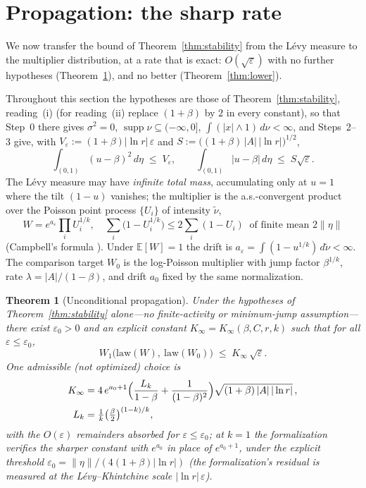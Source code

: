 \documentclass[pdflatex,sn-mathphys-num]{sn-jnl}
\theoremstyle{thmstyleone}
\newtheorem{theorem}{Theorem}
\theoremstyle{thmstyletwo}
\theoremstyle{thmstylethree}
\DeclareMathOperator{\supp}{supp}
\begin{document}
\section{Propagation: the sharp rate}
\label{sec:propagation}

We now transfer the bound of Theorem~\ref{thm:stability} from the
L\'evy measure to the multiplier distribution, at a rate that is
exact: $O(\sqrt\varepsilon)$ with no further hypotheses
(Theorem~\ref{thm:propagation}), and no better
(Theorem~\ref{thm:lower}).

Throughout this section the hypotheses are those of
Theorem~\ref{thm:stability}, reading~(i) (for reading~(ii) replace
$(1+\beta)$ by $2$ in every constant), so that Step~0 there gives
$\sigma^2 = 0$, $\supp\nu \subseteq (-\infty,0]$,
$\int(|x|\wedge1)\,d\nu < \infty$, and Steps~2--3 give, with
$V_\varepsilon := (1+\beta)|\ln r|\,\varepsilon$ and
$S := \bigl((1+\beta)\,|A|\,|\ln r|\bigr)^{1/2}$,
\begin{equation}\label{eq:VF}
  \int_{(0,1)}(u-\beta)^2\,d\eta \;\le\; V_\varepsilon,
  \qquad
  \int_{(0,1)}|u-\beta|\,d\eta \;\le\; S\sqrt{\varepsilon} .
\end{equation}
The L\'evy measure may have \emph{infinite total mass},
accumulating only at $u = 1$ where the tilt $(1-u)$ vanishes; the
multiplier is the a.s.-convergent product over the Poisson point
process $\{U_i\}$ of intensity $\tilde\nu$,
\[
  W = e^{a_\varepsilon}\prod_i U_i^{1/k},
  \quad
  \sum_i\bigl(1 - U_i^{1/k}\bigr) \le 2\sum_i(1-U_i)
  \ \text{ of finite mean } 2\|\eta\|
\]
(Campbell's formula \cite{Kin93}).  Under $\mathbb{E}[W]=1$ the
drift is $a_\varepsilon = \int(1-u^{1/k})\,d\tilde\nu < \infty$.
The comparison target $W_0$ is the log-Poisson multiplier with jump
factor $\beta^{1/k}$, rate $\lambda = |A|/(1-\beta)$, and drift
$a_0$ fixed by the same normalization.

\begin{theorem}[Unconditional propagation]\label{thm:propagation}
Under the hypotheses of Theorem~\textup{\ref{thm:stability}}
alone---no finite-activity or minimum-jump assumption---there exist
$\varepsilon_0 > 0$ and an explicit constant $K_\infty =
K_\infty(\beta, C, r, k)$ such that for all $\varepsilon \le
\varepsilon_0$,
\[
  W_1\bigl(\mathrm{law}(W),\ \mathrm{law}(W_0)\bigr)
  \;\le\; K_\infty\,\sqrt{\varepsilon}.
\]
One admissible (not optimized) choice is
\[
\begin{aligned}
  K_\infty &= 4\,e^{a_0+1}\Bigl(\frac{L_k}{1-\beta}
  + \frac{1}{(1-\beta)^2}\Bigr)
  \sqrt{(1+\beta)\,|A|\,|\ln r|}\,,\\
  L_k &= \tfrac1k\bigl(\tfrac\beta2\bigr)^{(1-k)/k},
\end{aligned}
\]
with the $O(\varepsilon)$ remainders absorbed for $\varepsilon \le
\varepsilon_0$; at $k = 1$ the formalization verifies the sharper
constant with $e^{a_0}$ in place of $e^{a_0+1}$, under the explicit
threshold $\varepsilon_0 = \|\eta\|/(4(1+\beta)|\ln r|)$ (the
formalization's residual is measured at the L\'evy--Khintchine scale
$|\ln r|\,\varepsilon$).
\end{theorem}
\end{document}
